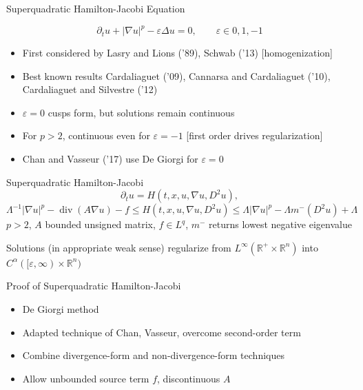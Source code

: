 \documentclass{beamer}
\newcommand{\R}{\mathbb{R}}
\newcommand{\eps}{\varepsilon}
\newcommand{\paren}[1]{\left( #1 \right)}
\newcommand{\del}{\partial}
\newcommand{\grad}{\nabla}
\renewcommand{\div}{\operatorname{div}}
\newcommand{\Laplace}{\Delta}
\newcommand{\n}{^{-1}}
\begin{document}

\begin{frame}{Superquadratic Hamilton-Jacobi Equation}

\[ \del_t u + |\grad u|^p - \eps \Laplace u = 0, \qquad \eps \in {0,1,-1} \]

\begin{itemize}
\item First considered by Lasry and Lions ('89), Schwab ('13) [homogenization]
\item Best known results Cardaliaguet ('09), Cannarsa and Cardaliaguet ('10), Cardaliaguet and Silvestre ('12)
\item $\eps = 0$ cusps form, but solutions remain continuous
\item For $p > 2$, continuous even for $\eps = -1$ [first order drives regularization]
\item Chan and Vasseur ('17) use De Giorgi for $\eps = 0$
\end{itemize}

\end{frame}


\begin{frame}{Superquadratic Hamilton-Jacobi}
\[ \del_t u = H\paren{t,x,u,\grad u, D^2 u}, \]
\[ \Lambda\n |\grad u|^p - \div\paren{A \grad u} - f \leq H\paren{t,x,u,\grad u, D^2 u} \leq \Lambda |\grad u|^p - \Lambda m^-(D^2 u) + \Lambda \]
$p > 2$, $A$ bounded unsigned matrix, $f \in L^q$, $m^-$ returns lowest negative eigenvalue

\begin{theorem}
Solutions (in appropriate weak sense) regularize from $L^\infty(\R^+\times\R^n)$ into $C^\alpha([\eps,\infty)\times \R^n)$
\end{theorem}
\end{frame}


\begin{frame}{Proof of Superquadratic Hamilton-Jacobi}
\begin{itemize}
\item De Giorgi method
\item Adapted technique of Chan, Vasseur, overcome second-order term
\item Combine divergence-form and non-divergence-form techniques
\item Allow unbounded source term $f$, discontinuous $A$
\end{itemize}
\end{frame}
\end{document}
